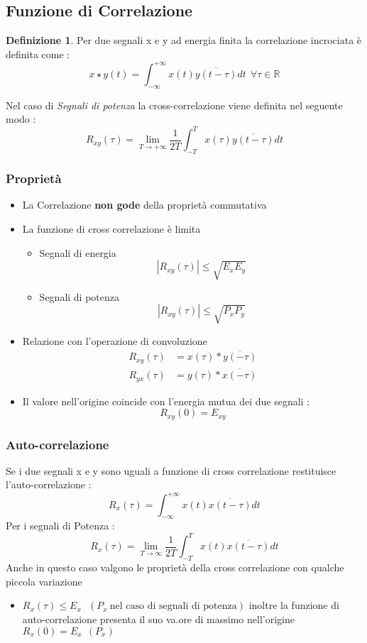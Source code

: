 \documentclass{article}
\theoremstyle{definition}
\newtheorem*{definizione}{Definizione}
\newcommand{\R}{\mathbb{R}}
\newcommand{\intinf}{\int_{-\infty}^{+\infty}}
\begin{document}
\subsection{Funzione di Correlazione}
\begin{definizione}
	Per due segnali x e y ad energia finita la correlazione incrociata è definita come : 
	$$x \star y (t)=\intinf x(t)\overline{y(t-\tau)}dt  \ \ \forall \tau \in \R$$

Nel caso di \textit{Segnali di potenza} la cross-correlazione viene definita nel seguente modo :
$$R_{xy}(\tau)=\lim_{T\rightarrow +\infty}\frac{1}{2T}\int_{-T}^{T}x(\tau)\overline{y(t-\tau)}dt$$
\end{definizione}
\subsubsection{Proprietà}
\begin{itemize}
\item La Correlazione \textbf{non gode} della proprietà commutativa
\item La funzione di cross correlazione è limita 
\begin{itemize}
	\item Segnali di energia 
	$$|R_{xy}(\tau)| \leq \sqrt{E_x E_y}$$
	\item Segnali di potenza
		$$|R_{xy}(\tau)| \leq \sqrt{P_x P_y}$$
\end{itemize}
\item Relazione con l'operazione di convoluzione 
\begin{align*}
	R_{xy}(\tau)&= x(\tau) * \overline{y(-\tau)}\\
	R_{yx}(\tau)&=y(\tau) * \overline{x(-\tau)}
\end{align*}
\item Il valore nell'origine coincide con l'energia mutua dei due segnali :
$$R_{xy}(0)=E_{xy}$$
\end{itemize}
\subsubsection{Auto-correlazione}
Se i due segnali x e y sono uguali a funzione di cross correlazione restituisce l'auto-correlazione : 
$$R_x(\tau)=\intinf x(t)\overline{x(t-\tau)}dt$$
Per i segnali di Potenza : 
$$R_x(\tau)=\lim_{T\rightarrow \infty } \frac{1}{2T}\int_{-T}^{T} x(t) \overline{x(t-\tau)}dt$$
Anche in questo caso valgono le proprietà della cross correlazione con qualche piccola variazione 
\begin{itemize}
	\item $R_x(\tau) \leq E_x \ \ \  (P_x \  \text{nel caso di segnali di potenza})$ inoltre la funzione di auto-correlazione presenta il suo va.ore di massimo nell'origine $R_x(0)=E_x \ \ (P_x)$
\end{itemize}
\end{document}
